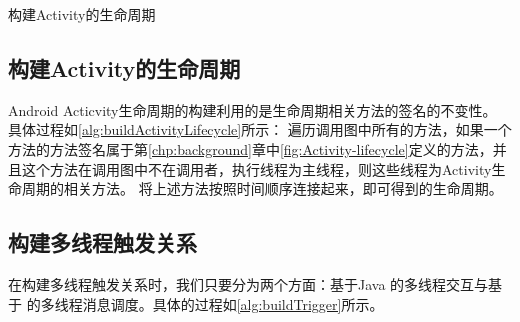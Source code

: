 \begin{algorithm}[!ht]
	\caption{构建Activity的生命周期} 
	\label{alg:buildActivityLifecycle}
    


	
	
\end{algorithm}


\subsection{构建Activity的生命周期}

Android Acticvity生命周期的构建利用的是生命周期相关方法的签名的不变性。
具体过程如\autoref{alg:buildActivityLifecycle}所示：
遍历调用图中所有的方法，如果一个方法的方法签名属于第\ref{chp:background}章中\autoref{fig:Activity-lifecycle}定义的方法，并且这个方法在调用图中不在调用者，执行线程为主线程，则这些线程为Activity生命周期的相关方法。
将上述方法按照时间顺序连接起来，即可得到的生命周期。


 \subsection{构建多线程触发关系}
在构建多线程触发关系时，我们只要分为两个方面：基于Java 的多线程交互与基于 的多线程消息调度。具体的过程如\autoref{alg:buildTrigger}所示。



